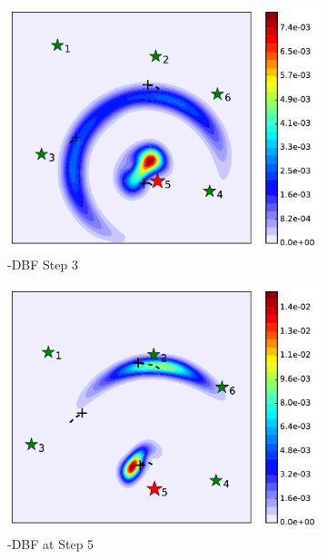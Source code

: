 	\begin{figure}%
		\centering		
		\begin{subfigure}[b]{0.23\textwidth}
			\includegraphics[width=\textwidth]{figures/dbf_hetero_mov_sen_mov_tar_rbt5_step3}
			\caption{\proto-DBF Step 3}\label{fig:step3}
		\end{subfigure}
		\begin{subfigure}[b]{0.23\textwidth}
			\includegraphics[width=\textwidth]{figures/dbf_hetero_mov_sen_mov_tar_rbt5_step5}
			\caption{\proto-DBF at Step 5}\label{fig:step5}
		\end{subfigure}
		\begin{subfigure}[b]{0.23\textwidth}

\end{subfigure}
\end{figure}

